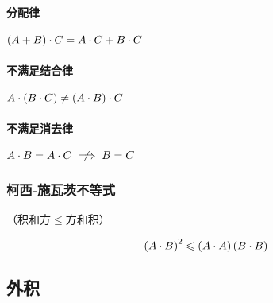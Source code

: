 \documentclass{article}
\begin{document}
\paragraph{分配律}$\left(A+B\right)\cdot C=A\cdot C+B\cdot C$

\paragraph{不满足结合律}$A\cdot\left(B\cdot C\right)\neq\left(A\cdot B\right)\cdot C$

\paragraph{不满足消去律}$A\cdot B=A\cdot C\centernot\implies B=C$

\subsubsection{柯西-施瓦茨不等式}

（积和方$\leqslant$方和积）

\[\left(A\cdot B\right)^2\leqslant\left(A\cdot A\right)\left(B\cdot B\right)\]

\subsection{外积\label{OuterProduct}}
\end{document}
